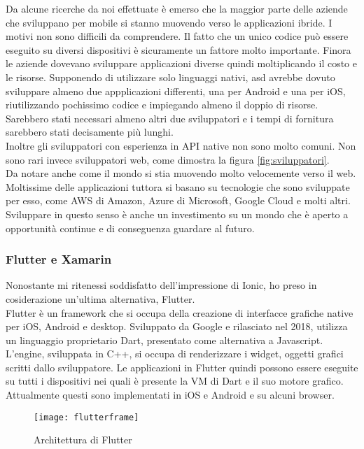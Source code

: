 Da alcune ricerche da noi effettuate è emerso che la maggior parte delle aziende che sviluppano per mobile si stanno
muovendo verso le applicazioni ibride. I motivi non sono difficili da comprendere. Il fatto che un unico codice può
essere eseguito su diversi dispositivi è sicuramente un fattore molto importante. Finora le aziende dovevano sviluppare
applicazioni diverse quindi moltiplicando il costo e le risorse. Supponendo di utilizzare solo linguaggi nativi,
\acrlong{asd} avrebbe dovuto sviluppare almeno due appplicazioni differenti, una per Android e una per iOS,
riutilizzando pochissimo codice e impiegando almeno il doppio di risorse. Sarebbero stati necessari almeno altri due
sviluppatori e i tempi di fornitura sarebbero stati decisamente più lunghi. \\
Inoltre gli sviluppatori con esperienza in API native non sono molto comuni. Non sono rari invece sviluppatori web, come
dimostra la figura \autoref{fig:sviluppatori}. \\
Da notare anche come il mondo si stia muovendo molto velocemente verso il web. Moltissime delle applicazioni tuttora si
basano su tecnologie che sono sviluppate per esso, come AWS di Amazon, Azure di Microsoft, Google Cloud e molti altri.
Sviluppare in questo senso è anche un investimento su un mondo che è aperto a opportunità continue e di conseguenza
guardare al futuro.

\subsubsection{Flutter e Xamarin}
Nonostante mi ritenessi soddisfatto dell'impressione di Ionic, ho preso in cosiderazione un'ultima alternativa, Flutter. \\
Flutter è un framework che si occupa della creazione di interfacce grafiche native per iOS, Android e desktop. Sviluppato da Google e
rilasciato nel 2018, utilizza un linguaggio proprietario Dart, presentato come alternativa a Javascript. L'engine, sviluppata in
\gls{C++}, si occupa di renderizzare i widget, oggetti grafici scritti dallo sviluppatore. Le applicazioni in Flutter quindi possono essere
eseguite su tutti i dispositivi nei quali è presente la VM di Dart e il suo motore grafico. Attualmente questi sono implementati in iOS e
Android e su alcuni browser. \\

\begin{figure}[h]
  \texttt{[image: flutterframe]} 
  \caption{Architettura di Flutter}
  \label{fig:flutter}
\end{figure}

